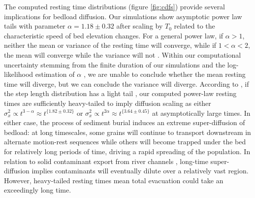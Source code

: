\documentclass[draft]{agujournal2018}
\begin{document}
The computed resting time distributions (figure \ref{fig:cdfs}) provide several implications for bedload diffusion.
Our simulations show asymptotic power law tails with parameter $\alpha = 1.18 \pm 0.32$ after scaling by $T_0$ related to the characteristic speed of bed elevation changes.
For a general power law, if $\alpha>1$, neither the mean or variance of the resting time will converge, while if $1<\alpha <2$, the mean will converge while the variance will not \citep[e.g.,][]{Bradley2017}.
Within our computational uncertainty stemming from the finite duration of our simulations and the log-likelihood estimation of $\alpha$ \citep[e.g.,][]{Newman2005}, we are unable to conclude whether the mean resting time will diverge, but we can conclude the variance will diverge.
According to \citet{Weeks1998}, if the step length distribution has a light tail \citep[e.g.,][]{Hassan2013}, our computed power-law resting times are sufficiently heavy-tailed to imply diffusion scaling as either $\sigma_x^2 \propto t^{3-\alpha} \approx t^{\{1.82 \pm 0.32 \}}$ or $\sigma_x^2 \propto t^{2\alpha} \approx t^{\{3.64\pm 0.45\}}$ at asymptotically large times.
In either case, the process of sediment burial induces an extreme super-diffusion of bedload: at long timescales, some grains will continue to transport downstream in alternate motion-rest sequences while others will become trapped under the bed for relatively long periods of time, driving a rapid spreading of the population.
In relation to solid contaminant export from river channels \citep[e.g.,][]{Malmon2005}, long-time super-diffusion implies contaminants will eventually dilute over a relatively vast region. However, heavy-tailed resting times mean total evacuation could take an exceedingly long time.
\end{document}
